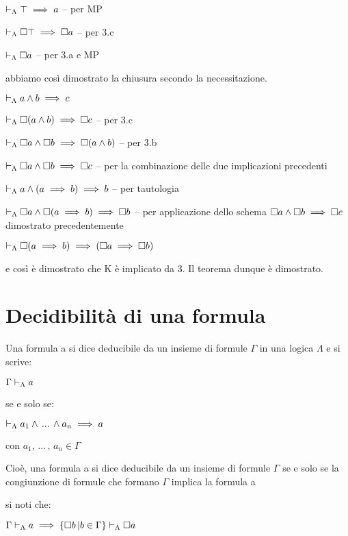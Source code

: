 $\vdash_{\Lambda}\top\implies a$ -- per MP

$\vdash_{\Lambda}\square\top\implies\square a$ -- per 3.c

$\vdash_{\Lambda}\square a$ -- per 3.a e MP

abbiamo così dimostrato la chiusura secondo la necessitazione.

$\vdash_{\Lambda}a\wedge b\implies c$

$\vdash_{\Lambda}\square(a\wedge b)\implies\square c$ -- per 3.c

$\vdash_{\Lambda}\square a\wedge\square b\implies\square(a\wedge b)$ --
per 3.b

$\vdash_{\Lambda}\square a\wedge\square b\implies\square c$ -- per la combinazione
delle due implicazioni precedenti

$\vdash_{\Lambda}a\wedge(a\implies b)\implies b$ -- per tautologia

$\vdash_{\Lambda}\square a\wedge\square(a\implies b)\implies\square b$
-- per applicazione dello schema $\square a\wedge\square b\implies\square c$
dimostrato precedentemente

$\vdash_{\Lambda}\square(a\implies b)\implies(\square a\implies\square b)$

e così è dimostrato che K è implicato da 3. Il teorema dunque è dimostrato.


\section{Decidibilità di una formula}

Una formula a si dice deducibile da un insieme di formule $\Gamma$
in una logica $\Lambda$ e si scrive:

$\Gamma\vdash_{\Lambda}a$

se e solo se:

$\vdash_{\Lambda}a_{1}\wedge\,...\,\wedge a_{n}\implies a$

con $a_{1},\,...\,,\, a_{n}\in\Gamma$

Cioè, una formula a si dice deducibile da un insieme di formule $\Gamma$
se e solo se la congiunzione di formule che formano $\Gamma$ implica
la formula a

si noti che:

$\Gamma\vdash_{\Lambda}a\implies\{\square b\,|b\in\Gamma\}\vdash_{\Lambda}\square a$ 
